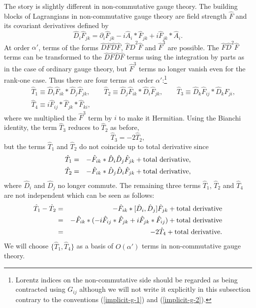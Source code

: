 \documentclass[a4paper,12pt]{article}
\begin{document}
The story is slightly different in non-commutative gauge theory.
The building blocks of Lagrangians in non-commutative gauge theory
are field strength $\hat{F}$
and its covariant derivatives defined by
\begin{equation}
\hat{D}_i \hat{F}_{jk} =
\partial_i \hat{F}_{jk} -i \hat{A}_i \ast \hat{F}_{jk}
+i \hat{F}_{jk} \ast \hat{A}_i.
\end{equation}
At order $\alpha'$,
terms of the forms $\hat{D} \hat{F} \hat{D} \hat{F}$,
$\hat{F} \hat{D}^2 \hat{F}$ and $\hat{F}^3$ are possible.
The $\hat{F} \hat{D}^2 \hat{F}$ terms can be transformed
to the $\hat{D} \hat{F} \hat{D} \hat{F}$ terms
using the integration by parts
as in the case of ordinary gauge theory,
but $\hat{F}^3$ terms no longer vanish
even for the rank-one case.
Thus there are four terms at order $\alpha'$:\footnote{
Lorentz indices on the non-commutative side
should be regarded as being contracted using $G_{ij}$
although we will not write it explicitly
in this subsection
contrary to the conventions (\ref{implicit-g-1})
and (\ref{implicit-g-2}).
}
\begin{eqnarray}
&& \hat{T}_1 \equiv \hat{D}_i \hat{F}_{ik}
\ast \hat{D}_j \hat{F}_{jk}, \qquad
\hat{T}_2 \equiv \hat{D}_j \hat{F}_{ik}
\ast \hat{D}_i \hat{F}_{jk}, \qquad
\hat{T}_3 \equiv \hat{D}_k \hat{F}_{ij}
\ast \hat{D}_k \hat{F}_{ji},
\nonumber \\
&& \hat{T}_4 \equiv
i \hat{F}_{ij} \ast \hat{F}_{jk} \ast \hat{F}_{ki},
\end{eqnarray}
where we multiplied the $\hat{F}^3$ term by $i$
to make it Hermitian.
Using the Bianchi identity, the term $\hat{T}_3$
reduces to $\hat{T}_2$ as before,
\begin{equation}
\hat{T}_3 = -2 \hat{T}_2,
\end{equation}
but the terms $\hat{T}_1$ and $\hat{T}_2$
do not coincide up to total derivative since
\begin{eqnarray}
\hat{T}_1 &=& - \hat{F}_{ik} \ast \hat{D}_i \hat{D}_j \hat{F}_{jk}
+ {\rm total~derivative}, \\
\hat{T}_2 &=& - \hat{F}_{ik} \ast \hat{D}_j \hat{D}_i \hat{F}_{jk}
+ {\rm total~derivative},
\end{eqnarray}
where $\hat{D}_i$ and $\hat{D}_j$ no longer commute.
The remaining three terms $\hat{T}_1$, $\hat{T}_2$ and $\hat{T}_4$
are not independent which can be seen as follows:
\begin{eqnarray}
\hat{T}_1 - \hat{T}_2
&=& - \hat{F}_{ik} \ast [ \hat{D}_i, \hat{D}_j] \hat{F}_{jk}
+ {\rm total~derivative}
\nonumber \\
&=& - \hat{F}_{ik} \ast
(-i \hat{F}_{ij} \ast \hat{F}_{jk} +i \hat{F}_{jk} \ast \hat{F}_{ij})
+ {\rm total~derivative}
\nonumber \\
&=& -2 \hat{T}_4 + {\rm total~derivative}.
\end{eqnarray}
We will choose $\{ \hat{T}_1, \hat{T}_4 \}$
as a basis of $O(\alpha')$ terms in non-commutative gauge theory.
\end{document}
